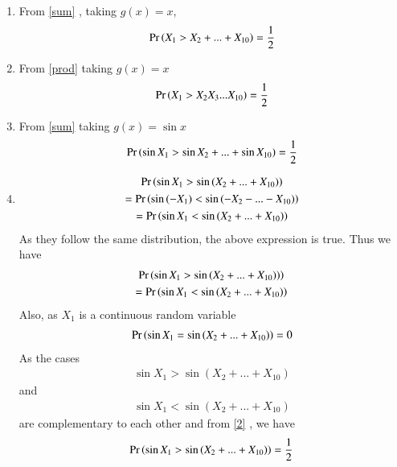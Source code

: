 \documentclass[journal,12pt,twocolumn]{IEEEtran}
\begin{document}
\begin{enumerate}[label = (\Alph*)]
    \item 
    From \eqref{sum} , taking $g(x)=x$,
    \begin{align}
        \Pr\left(X_1>X_2+...+X_{10}\right)=\frac{1}{2}
    \end{align}
\item
From \eqref{prod} taking $g(x)=x$
        \begin{align}
         \Pr\left(X_1>X_2X_3...X_{10}\right)=\frac{1}{2}   
        \end{align}
\item 
From \eqref{sum} taking $g(x)=\sin{x}$
        \begin{align}
         \Pr\left(\sin{X_1}>\sin{X_2}+...+\sin{X_{10}}\right)=\frac{1}{2}   
        \end{align}
\item \begin{multline}
        \Pr\left(\sin{X_1}>\sin{(X_2+...+X_{10})}\right)\\=\Pr\left(\sin{(-X_1)}<\sin{(-X_2-...-X_{10})}\right)\\
        =\Pr\left(\sin{X_1}<\sin{(X_2+...+X_{10})}\right)
    \end{multline}
    As they follow the same distribution, the above expression is true.
    Thus we have
    \begin{multline}\label{2} 
    \Pr\left(\sin{X_1}>\sin{(X_2+...+X_{10}}))\right)\\
        =\Pr\left(\sin{X_1}<\sin{(X_2+...+X_{10}})\right)    
    \end{multline}
    Also, as $X_1$ is a continuous random variable
    \begin{align}
       \Pr\left(\sin{X_1}=\sin{(X_2+...+X_{10})}\right)=0
    \end{align}
     As the cases
     \begin{align}
      {\sin{X_1}>\sin{(X_2+...+X_{10})}}   
     \end{align}and 
     \begin{align}
         {\sin{X_1}<\sin{(X_2+...+X_{10})}} 
     \end{align}are complementary to each other and from \eqref{2}  , we have 
        \begin{align}
         \Pr\left(\sin{X_1}>\sin{(X_2+...+X_{10}})\right)=\frac{1}{2}   
        \end{align}

\end{enumerate}
\end{document}
